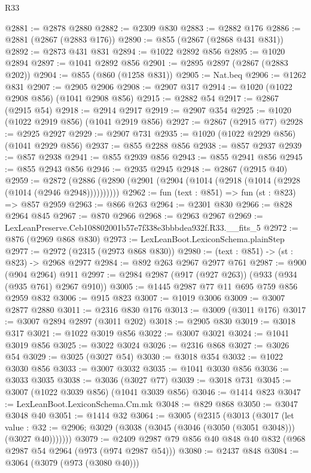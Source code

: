 \begin{lexlean}{R33}
\begin{coremodule}
@2881 := @2878 @2880
@2882 := @2309 @830
@2883 := @2882 @176
@2886 := @2881 (@2867 (@2883 @176))
@2890 := @855 (@2867 (@2868 @431 @831))
@2892 := @2873 @431 @831
@2894 := @1022 @2892 @856
@2895 := @1020 @2894
@2897 := @1041 @2892 @856
@2901 := @2895 @2897 (@2867 (@2883 @202))
@2904 := @855 (@860 (@1258 @831))
@2905 := Nat.beq
@2906 := @1262 @831
@2907 := @2905 @2906
@2908 := @2907 @317
@2914 := @1020 (@1022 @2908 @856) (@1041 @2908 @856)
@2915 := @2882 @54
@2917 := @2867 (@2915 @54)
@2918 := @2914 @2917
@2919 := @2907 @354
@2925 := @1020 (@1022 @2919 @856) (@1041 @2919 @856)
@2927 := @2867 (@2915 @77)
@2928 := @2925 @2927
@2929 := @2907 @731
@2935 := @1020 (@1022 @2929 @856) (@1041 @2929 @856)
@2937 := @855 @2288 @856
@2938 := @857 @2937
@2939 := @857 @2938
@2941 := @855 @2939 @856
@2943 := @855 @2941 @856
@2945 := @855 @2943 @856
@2946 := @2935 @2945
@2948 := @2867 (@2915 @40)
@2959 := @2872 (@2886 (@2890 (@2901 (@2904 (@1014 (@2918 (@1014 (@2928 (@1014 (@2946 @2948))))))))))
@2962 := fun (text : @851) => fun (st : @823) => @857 @2959
@2963 := @866 @263
@2964 := @2301 @830
@2966 := @828 @2964 @845
@2967 := @870 @2966
@2968 := @2963 @2967
@2969 := LexLeanPreserve.Ceb108802001b57e7f338e3bbbdea932f.R33.__fits_5
@2972 := @876 (@2969 @868 @830)
@2973 := LexLeanBoot.LexiconSchema.plainStep
@2977 := @2972 (@2315 (@2973 @868 @830))
@2980 := (text : @851) -> (st : @823) -> @2968 @2977
@2984 := @892 @263 @2967 @2977 @761
@2987 := @900 (@904 @2964) @911
@2997 := @2984 @2987 (@917 (@927 @263)) (@933 (@934 (@935 @761) @2967 @910))
@3005 := @1445 @2987 @77 @11 @695 @759 @856 @2959 @832
@3006 := @915 @823
@3007 := @1019 @3006
@3009 := @3007 @2877 @2880
@3011 := @2316 @830 @176
@3013 := @3009 (@3011 @176)
@3017 := @3007 @2894 @2897 (@3011 @202)
@3018 := @2905 @830
@3019 := @3018 @317
@3021 := @1022 @3019 @856
@3022 := @3007 @3021
@3024 := @1041 @3019 @856
@3025 := @3022 @3024
@3026 := @2316 @868
@3027 := @3026 @54
@3029 := @3025 (@3027 @54)
@3030 := @3018 @354
@3032 := @1022 @3030 @856
@3033 := @3007 @3032
@3035 := @1041 @3030 @856
@3036 := @3033 @3035
@3038 := @3036 (@3027 @77)
@3039 := @3018 @731
@3045 := @3007 (@1022 @3039 @856) (@1041 @3039 @856)
@3046 := @1414 @823
@3047 := LexLeanBoot.LexiconSchema.Cm.mk
@3048 := @829 @868
@3050 := @3047 @3048 @40
@3051 := @1414 @32
@3064 := @3005
    (@2315
      (@3013
        (@3017
          (let value : @32 := @2906;
          @3029 (@3038 (@3045 (@3046 (@3050 (@3051 @3048))) (@3027 @40)))))))
@3079 := @2409 @2987 @79 @856 @40 @848 @40 @832 (@968 @2987 @54 @2964 (@973 (@974 @2987 @54)))
@3080 := @2437 @848
@3084 := @3064 (@3079 (@973 (@3080 @40)))

\end{coremodule}
\end{lexlean}
